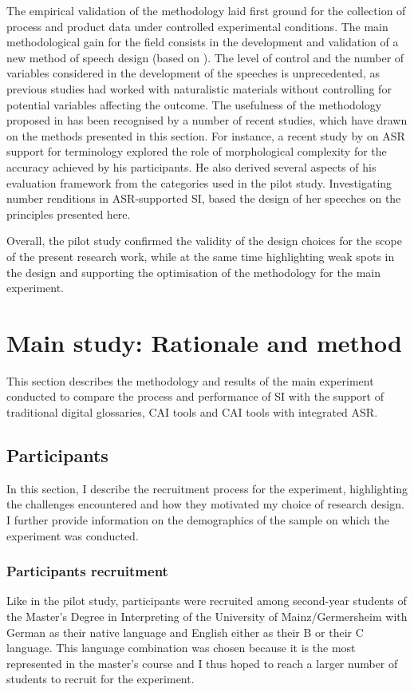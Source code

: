 The empirical validation of the methodology laid first ground for the collection of process and product data under controlled experimental conditions. The main methodological gain for the field consists in the development and validation of a new method of speech design (based on \citealt{seeber_cognitive_2012}). The level of control and the number of variables considered in the development of the speeches is unprecedented, as previous studies had worked with naturalistic materials without controlling for potential variables affecting the outcome. The usefulness of the methodology proposed in \citet{prandi_designing_2017,prandi_exploratory_2018} has been recognised by a number of recent studies, which have drawn on the methods presented in this section. For instance, a recent study by \citet{van_cauwenberghe_etude_2020} on ASR support for terminology explored the role of morphological complexity for the accuracy achieved by his participants. He also derived several aspects of his evaluation framework from the categories used in the pilot study. Investigating number renditions in ASR-supported SI, \citet{frittella_cai-supported_2021} based the design of her speeches on the principles presented here.

Overall, the pilot study confirmed the validity of the design choices for the scope of the present research work, while at the same time highlighting weak spots in the design and supporting the optimisation of the methodology for the main experiment.


\section{Main study: Rationale and method} \label{main_study}
This section describes the methodology and results of the main experiment conducted to compare the process and performance of SI with the support of traditional digital glossaries, CAI tools and CAI tools with integrated ASR.
\subsection{Participants} \label{sample_main}
In this section, I describe the recruitment process for the experiment, highlighting the challenges encountered and how they motivated my choice of research design. I further provide information on the demographics of the sample on which the experiment was conducted.
\subsubsection{Participants recruitment} \label{recruitment_MS}
Like in the pilot study, participants were recruited among second-year students of the Master's Degree in Interpreting of the University of Mainz/Germersheim with German as their native language and English either as their B or their C language. This language combination was chosen because it is the most represented in the master's course and I thus hoped to reach a larger number of students to recruit for the experiment.


